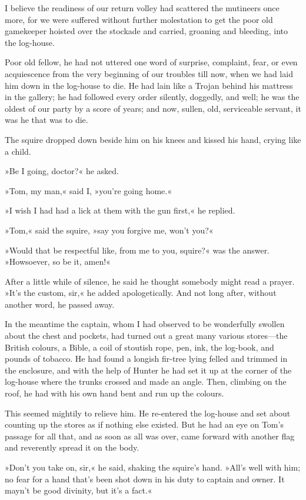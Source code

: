 I believe the readiness of our return volley had scattered the mutineers once more, for we were suffered without further molestation to get the poor old gamekeeper hoisted over the stockade and carried, groaning and bleeding, into the log-house.

Poor old fellow, he had not uttered one word of surprise, complaint, fear, or even acquiescence from the very beginning of our troubles till now, when we had laid him down in the log-house to die. He had lain like a Trojan behind his mattress in the gallery; he had followed every order silently, doggedly, and well; he was the oldest of our party by a score of years; and now, sullen, old, serviceable servant, it was he that was to die.

The squire dropped down beside him on his knees and kissed his hand, crying like a child.

»Be I going, doctor?« he asked.

»Tom, my man,« said I, »you're going home.«

»I wish I had had a lick at them with the gun first,« he replied.

»Tom,« said the squire, »say you forgive me, won't you?«

»Would that be respectful like, from me to you, squire?« was the answer. »Howsoever, so be it, amen!«

After a little while of silence, he said he thought somebody might read a prayer. »It's the custom, sir,« he added apologetically. And not long after, without another word, he passed away.

In the meantime the captain, whom I had observed to be wonderfully swollen about the chest and pockets, had turned out a great many various stores—the British colours, a Bible, a coil of stoutish rope, pen, ink, the log-book, and pounds of tobacco. He had found a longish fir-tree lying felled and trimmed in the enclosure, and with the help of Hunter he had set it up at the corner of the log-house where the trunks crossed and made an angle. Then, climbing on the roof, he had with his own hand bent and run up the colours.

This seemed mightily to relieve him. He re-entered the log-house and set about counting up the stores as if nothing else existed. But he had an eye on Tom's passage for all that, and as soon as all was over, came forward with another flag and reverently spread it on the body.

»Don't you take on, sir,« he said, shaking the squire's hand. »All's well with him; no fear for a hand that's been shot down in his duty to captain and owner. It mayn't be good divinity, but it's a fact.«

